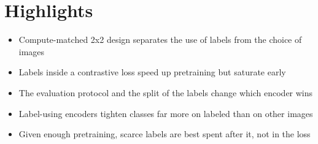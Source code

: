 \documentclass[12pt]{article}
\begin{document}
\section*{Highlights}
\begin{itemize}
\item Compute-matched 2x2 design separates the use of labels from the choice of images
\item Labels inside a contrastive loss speed up pretraining but saturate early
\item The evaluation protocol and the split of the labels change which encoder wins
\item Label-using encoders tighten classes far more on labeled than on other images
\item Given enough pretraining, scarce labels are best spent after it, not in the loss
\end{itemize}
\end{document}
